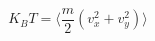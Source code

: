 
\begin{equation}
    K_B T = \langle \frac{m}{2} \left( v_x^2 + v_y^2 \right) \rangle
\end{equation}